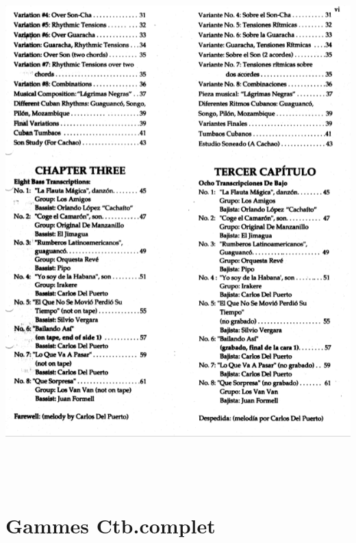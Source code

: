 \documentclass[a4paper]{book}
\begin{document}
\begin{center}
\includegraphics[width=16.111cm,height=20.131cm]{lebluessupportsmethodes-img177.png}
\end{center}
\clearpage


\section{Gammes Ctb.complet}
\end{document}
